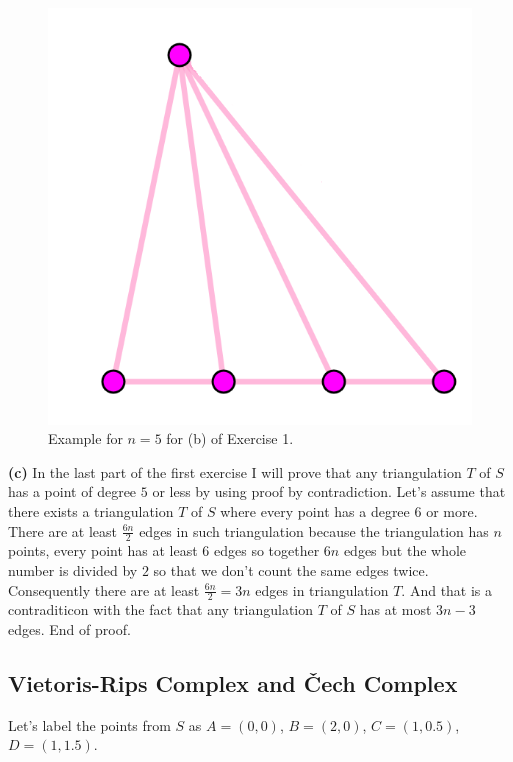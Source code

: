 \documentclass[12pt]{article}
\begin{document}
	 \begin{figure}
	 	\centering
	 	\includegraphics[scale=0.20] {graf1}
	 	\caption{\label{fig:1} Example for $n=5$ for (b) of Exercise 1. }
	 \end{figure}
	 
	 \textbf{(c)} In the last part of the first exercise I will prove that any triangulation $T$ of $S$ has a point of degree $5$ or less by using proof by contradiction. Let's assume that there exists a triangulation $T$ of $S$ where every point has a degree $6$ or more. There are at least $\frac{6n}{2}$ edges in such triangulation because the triangulation has $n$ points, every point has at least 6 edges so together $6n$ edges but the whole number is divided by $2$ so that we don't count the same edges twice. Consequently there are at least $\frac{6n}{2} = 3n$ edges in triangulation $T$. And that is a contraditicon with the fact that any triangulation $T$ of $S$ has at most $3n-3$ edges. End of proof.
	
	\subsection{Vietoris-Rips Complex and Čech Complex}
	Let's label the points from $S$ as $A=(0,0)$, $B=(2,0)$, $C=(1,0.5)$,$D=(1,1.5)$. \\
	
\end{document}
